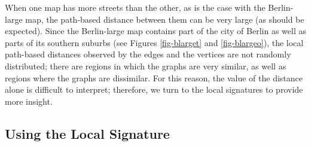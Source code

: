 \begin{table}[t]
\centering
{}
\end{table}


When one map has more streets than the other, as is the case with the
Berlin-large map, the
path-based distance between them can be very large (as should be expected).
Since the Berlin-large map contains part of the city of Berlin
as well as parts of its southern suburbs (see Figures \ref{fig-blarget} and
\ref{fig-blargeo}), the local path-based distances observed by the edges and
the vertices are not randomly distributed; there are regions in which
the graphs are very similar, as well as regions where the graphs are dissimilar.
For this reason,
the value of the distance alone is difficult to interpret; therefore, we turn
to the local signatures to provide more insight.





\subsection{Using the Local Signature}
\label{subsec-experimentsSignature}


